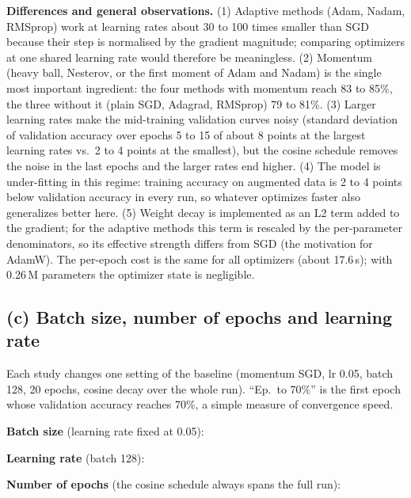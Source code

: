 \documentclass[11pt,a4paper]{article}
\begin{document}
\textbf{Differences and general observations.}
(1) Adaptive methods (Adam, Nadam, RMSprop) work at learning rates about 30 to 100 times smaller than SGD because their step is normalised by the gradient magnitude; comparing optimizers at one shared learning rate would therefore be meaningless.
(2) Momentum (heavy ball, Nesterov, or the first moment of Adam and Nadam) is the single most important ingredient: the four methods with momentum reach 83 to 85\%, the three without it (plain SGD, Adagrad, RMSprop) 79 to 81\%.
(3) Larger learning rates make the mid-training validation curves noisy (standard deviation of validation accuracy over epochs 5 to 15 of about 8 points at the largest learning rates vs.\ 2 to 4 points at the smallest), but the cosine schedule removes the noise in the last epochs and the larger rates end higher.
(4) The model is under-fitting in this regime: training accuracy on augmented data is 2 to 4 points below validation accuracy in every run, so whatever optimizes faster also generalizes better here.
(5) Weight decay is implemented as an L2 term added to the gradient; for the adaptive methods this term is rescaled by the per-parameter denominators, so its effective strength differs from SGD (the motivation for AdamW). The per-epoch cost is the same for all optimizers (about 17.6\,s); with 0.26\,M parameters the optimizer state is negligible.

\subsection*{(c) Batch size, number of epochs and learning rate}

Each study changes one setting of the baseline (momentum SGD, lr 0.05, batch 128, 20 epochs, cosine decay over the whole run). ``Ep.\ to 70\%'' is the first epoch whose validation accuracy reaches 70\%, a simple measure of convergence speed.

\textbf{Batch size} (learning rate fixed at 0.05):
\begin{center}

\end{center}

\textbf{Learning rate} (batch 128):
\begin{center}

\end{center}

\textbf{Number of epochs} (the cosine schedule always spans the full run):
\begin{center}

\end{center}
\end{document}
